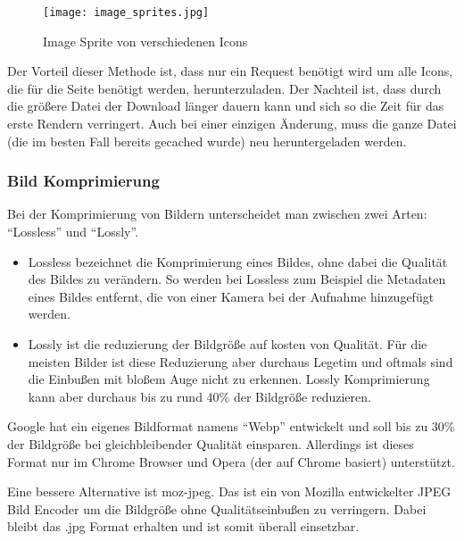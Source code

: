 			\begin{figure}[htbp]
				\begin{center}
					\texttt{[image: image\_sprites.jpg]}
					\caption{Image Sprite von verschiedenen Icons}
					\label{fig:image_sprites}
				\end{center}
			\end{figure}
			
			Der Vorteil dieser Methode ist, dass nur ein Request benötigt wird um alle Icons, die für die Seite benötigt werden, herunterzuladen. Der Nachteil ist, dass durch die größere Datei der Download länger dauern kann und sich so die Zeit für das erste Rendern verringert. Auch bei einer einzigen Änderung, muss die ganze Datei (die im besten Fall bereits gecached wurde) neu heruntergeladen werden.
			

		\subsubsection{Bild Komprimierung} %
		\label{ssub:bild_komprimierung}
			Bei der Komprimierung von Bildern unterscheidet man zwischen zwei Arten: "`Lossless"' und "`Lossly"'.
			\begin{itemize}
				\item Lossless bezeichnet die Komprimierung eines Bildes, ohne dabei die Qualität des Bildes zu verändern. So werden bei Lossless zum Beispiel die Metadaten eines Bildes entfernt, die von einer Kamera bei der Aufnahme hinzugefügt werden.
				\item Lossly ist die reduzierung der Bildgröße auf kosten von Qualität. Für die meisten Bilder ist diese Reduzierung aber durchaus Legetim und oftmals sind die Einbußen mit bloßem Auge nicht zu erkennen. Lossly Komprimierung kann aber durchaus bis zu rund 40\% der Bildgröße reduzieren.
			\end{itemize}

			Google hat ein eigenes Bildformat namens "`Webp"' entwickelt und soll bis zu 30\% der Bildgröße bei gleichbleibender Qualität einsparen. Allerdings ist dieses Format nur im Chrome Browser und Opera (der auf Chrome basiert) unterstützt.\autocite{canIuse}

			Eine bessere Alternative ist moz-jpeg. Das ist ein von Mozilla entwickelter JPEG Bild Encoder um die Bildgröße ohne Qualitätseinbußen zu verringern. Dabei bleibt das .jpg Format erhalten und ist somit überall einsetzbar.


